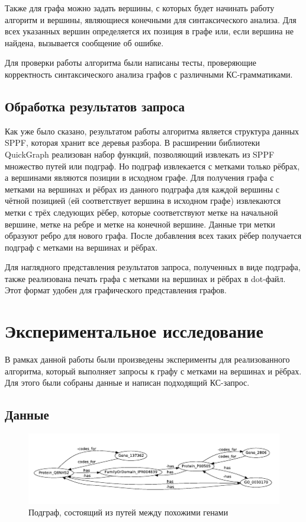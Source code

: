 \documentclass[14pt]{matmex-diploma}
\begin{document}
Также для графа можно задать вершины, с которых будет начинать работу алгоритм и вершины, являющиеся конечными для синтаксического анализа. Для всех указанных вершин определяется их позиция в графе или, если вершина не найдена, вызывается сообщение об ошибке.

Для проверки работы алгоритма были написаны тесты, проверяющие корректность синтаксического анализа графов с различными КС-грамматиками.

\subsection{Обработка результатов запроса}

Как уже было сказано, результатом работы алгоритма является структура данных SPPF, которая хранит все деревья разбора. В расширении библиотеки QuickGraph реализован набор функций,  позволяющий извлекать из SPPF множество путей или подграф. Но подграф извлекается с метками только рёбрах, а вершинами являются позиции в исходном графе. Для получения графа с метками на вершинах и рёбрах из данного подграфа для каждой вершины с чётной позицией (ей соответствует вершина в исходном графе) извлекаются метки с трёх следующих рёбер, которые соответствуют метке на начальной вершине, метке на ребре и метке на конечной вершине. Данные три метки образуют ребро для нового графа. После добавления всех таких рёбер получается подграф с метками на вершинах и рёбрах.

Для наглядного представления результатов запроса, полученных в виде подграфа, также реализована печать графа с метками на вершинах и рёбрах в dot-файл. Этот формат удобен для графического представления графов.

\section{Экспериментальное исследование}

В рамках данной работы были произведены эксперименты для реализованного алгоритма,  который выполняет запросы к графу с метками на вершинах и рёбрах. Для этого были собраны данные и написан подходящий КС-запрос.

\subsection{Данные}

\begin{figure}
\centering
\includegraphics[width=16cm]{images/subgraph.pdf}
\caption{Подграф, состоящий из путей между похожими генами}
\label{subgraph}
\end{figure}
\end{document}
